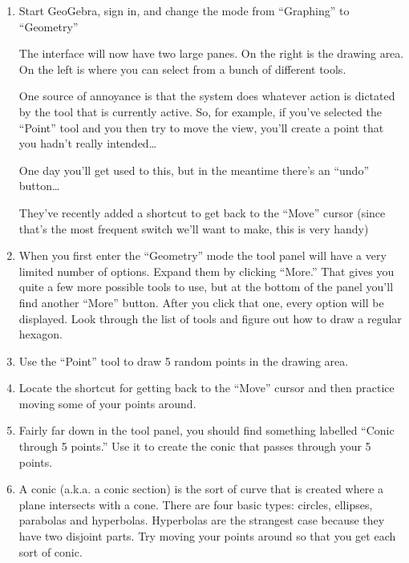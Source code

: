 \begin{enumerate}

\item Start GeoGebra, sign in, and change the mode from ``Graphing'' to ``Geometry''

The interface will now have two large panes.  On the right is the drawing area.  On the left is where you can select from a bunch of different tools.

One source of annoyance is that the system does whatever action is dictated by the tool that is currently active.  So, for example, if you've selected the ``Point'' tool and you then try to move the view, you'll create a point that you hadn't really intended\ldots

One day you'll get used to this, but in the meantime there's an ``undo'' button\ldots

They've recently added a shortcut to get back to the ``Move'' cursor (since that's the most frequent switch we'll want to make, this is very handy)
\vfill

\item When you first enter the ``Geometry'' mode the tool panel will have a very limited number of options.  Expand them by clicking ``More.''  That gives you quite a few more possible tools to use, but at the bottom of the panel you'll find another ``More'' button.  After you click that one, every option will be displayed.  Look through the list of tools and figure out how to draw a regular hexagon.

\vfill

\item Use the ``Point'' tool to draw 5 random points in the drawing area.  

\vfill

\item Locate the shortcut for getting back to the ``Move'' cursor and then practice moving some of your points around.

\vfill

\item Fairly far down in the tool panel, you should find something labelled ``Conic through 5 points.''  Use it to create the conic that passes through your 5 points.

\vfill

\item A conic (a.k.a. a conic section) is the sort of curve that is created where a plane intersects with a cone.  There are four basic types: circles, ellipses, parabolas and hyperbolas.  Hyperbolas are the strangest case because they have two disjoint parts.  Try moving your points around so that you get each sort of conic.


\end{enumerate}

